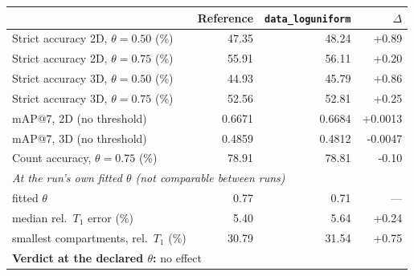 \renewcommand{\arraystretch}{1.05}
\begin{tabular}{lrrr}
\toprule
 & Reference & \texttt{data\_loguniform} & $\Delta$ \\
\midrule
Strict accuracy 2D, $\theta = 0.50$ (\%) & 47.35 & 48.24 & +0.89 \\
Strict accuracy 2D, $\theta = 0.75$ (\%) & 55.91 & 56.11 & +0.20 \\
Strict accuracy 3D, $\theta = 0.50$ (\%) & 44.93 & 45.79 & +0.86 \\
Strict accuracy 3D, $\theta = 0.75$ (\%) & 52.56 & 52.81 & +0.25 \\
\midrule
mAP@7, 2D (no threshold) & 0.6671 & 0.6684 & +0.0013 \\
mAP@7, 3D (no threshold) & 0.4859 & 0.4812 & -0.0047 \\
\midrule
Count accuracy, $\theta = 0.75$ (\%) & 78.91 & 78.81 & -0.10 \\
\midrule
\multicolumn{4}{l}{\emph{At the run's own fitted $\theta$ (not comparable between runs)}} \\
\quad fitted $\theta$ & 0.77 & 0.71 & --- \\
\quad median rel.\ $T_1$ error (\%) & 5.40 & 5.64 & +0.24 \\
\quad smallest compartments, rel.\ $T_1$ (\%) & 30.79 & 31.54 & +0.75 \\
\midrule
\multicolumn{4}{l}{\textbf{Verdict at the declared $\theta$:} no effect} \\
\bottomrule
\end{tabular}
